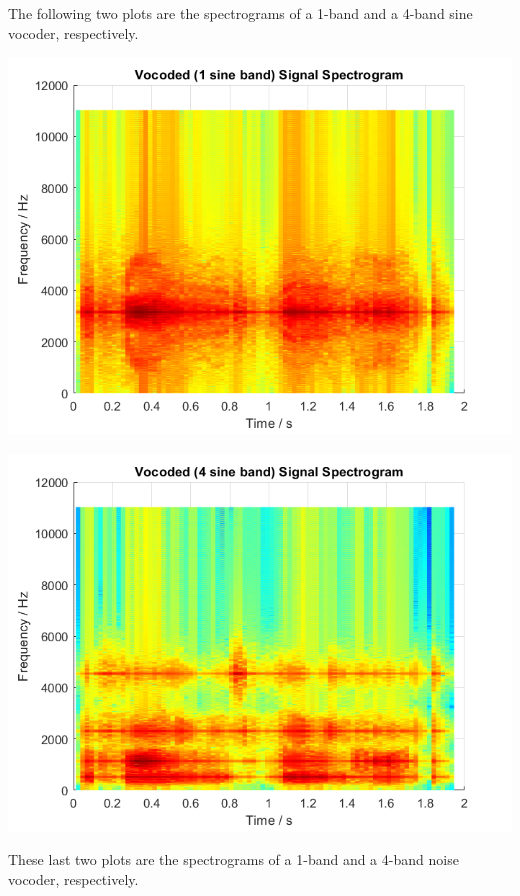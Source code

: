 \documentclass[11pt]{article}
\begin{document}
The following two plots are the spectrograms of a 1-band and a 4-band sine vocoder, respectively.

\includegraphics[height=0.4\textheight]{output/vocoded_1sine_spectrogram.png}

\includegraphics[height=0.4\textheight]{output/vocoded_4sine_spectrogram.png}

These last two plots are the spectrograms of a 1-band and a 4-band noise vocoder, respectively.
\end{document}
